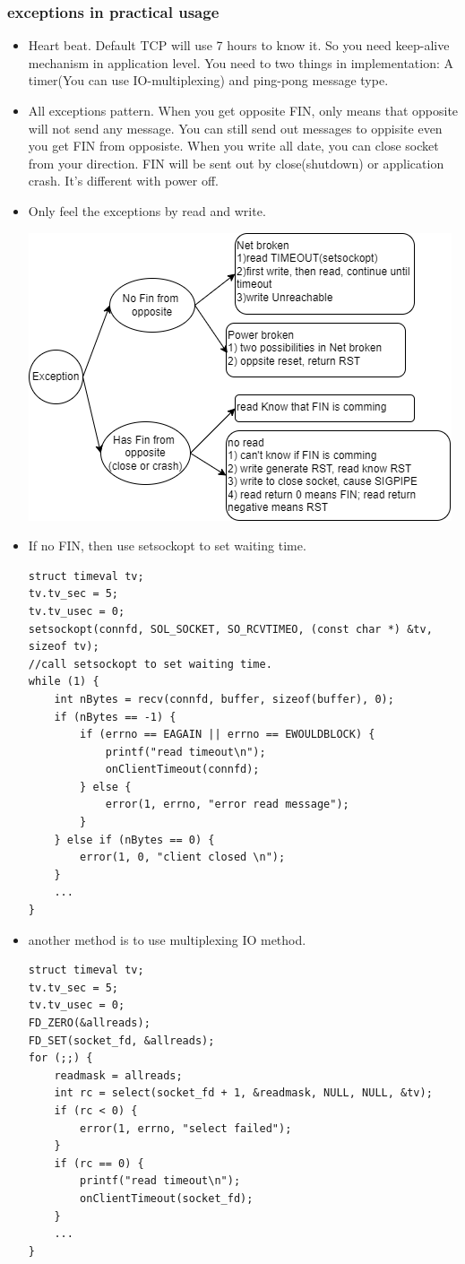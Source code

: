 \documentclass[a4paper,11pt,twoside]{book}
\begin{document}
\subsubsection{exceptions in practical usage}
\begin{itemize}
	\item Heart beat. Default TCP will use 7 hours to know it. So you need keep-alive mechanism in application level. You need to two things in implementation: A timer(You can use IO-multiplexing) and ping-pong message type.
	
\item All exceptions pattern. When you get opposite FIN, only means that opposite will not send any message.  You can still send out messages to oppisite even you get FIN from opposiste. When you write all date, you can close socket from your direction. FIN will be sent out by close(shutdown) or application crash.  It's different with power off. 

\item Only feel the exceptions by read and write. 
	\begin{center}
	\includegraphics[width=0.66\linewidth]{pics/net_ex.png}
\end{center}


\item If no FIN, then use setsockopt to set waiting time.
\begin{lstlisting}
struct timeval tv;
tv.tv_sec = 5;
tv.tv_usec = 0;
setsockopt(connfd, SOL_SOCKET, SO_RCVTIMEO, (const char *) &tv, sizeof tv);
//call setsockopt to set waiting time.
while (1) {
	int nBytes = recv(connfd, buffer, sizeof(buffer), 0);
	if (nBytes == -1) {
		if (errno == EAGAIN || errno == EWOULDBLOCK) {
			printf("read timeout\n");
			onClientTimeout(connfd);
		} else {
			error(1, errno, "error read message");
		}
	} else if (nBytes == 0) {
		error(1, 0, "client closed \n");
	}
	...
}
\end{lstlisting}

\item another method is to use multiplexing IO method.
\begin{lstlisting}
struct timeval tv;
tv.tv_sec = 5;
tv.tv_usec = 0;
FD_ZERO(&allreads);
FD_SET(socket_fd, &allreads);
for (;;) {
	readmask = allreads;
	int rc = select(socket_fd + 1, &readmask, NULL, NULL, &tv);
	if (rc < 0) {
		error(1, errno, "select failed");
	}
	if (rc == 0) {
		printf("read timeout\n");
		onClientTimeout(socket_fd);
	}
	...
}
\end{lstlisting}

\end{itemize}
\end{document}

